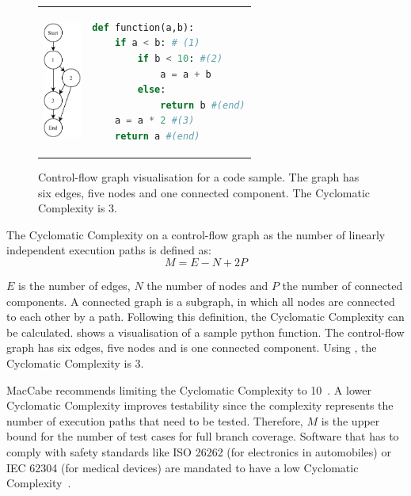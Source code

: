 \begin{figure}
\begin{tabular}{p{}p{}}
    \begin{minipage}{0.45\textwidth}
        \centering
    \includegraphics[height=1.5in]{img/Background/control-flow-graph.pdf}
    \label{fig:background_control_flow_graph_image}
    \end{minipage}
&
\begin{minipage}[c]{0.45\textwidth}
\centering
\begin{lstlisting}[language=Python, label=lst:background_control_flow_graph_listing]
def function(a,b):
    if a < b: # (1)
        if b < 10: #(2)
            a = a + b
        else:
            return b #(end)
    a = a * 2 #(3)
    return a #(end)
\end{lstlisting}
\end{minipage}
\end{tabular}
\caption{Control-flow graph visualisation for a code sample. The graph has six edges, five nodes and one connected component. The Cyclomatic Complexity is 3.}
\label{fig:background_control_flow_graph}
\end{figure}

The Cyclomatic Complexity on a control-flow graph as the number of linearly independent execution paths is defined as:
\begin{equation}\label{eq:cyclomatic_complexity}
M = E - N + 2P
\end{equation}

$E$ is the number of edges, $N$ the number of nodes and $P$ the number of connected components.  A connected graph is a subgraph, in which all nodes are connected to each other by a path. Following this definition, the Cyclomatic Complexity can be calculated.  shows a visualisation of a sample python function. The control-flow graph has six edges, five nodes and is one connected component. Using , the Cyclomatic Complexity is 3.

MacCabe recommends limiting the Cyclomatic Complexity to 10~\cite{mccabe_complexity_1976}. A lower Cyclomatic Complexity improves testability since the complexity represents the number of execution paths that need to be tested. Therefore, $M$ is the upper bound for the number of test cases for full branch coverage. 
Software that has to comply with safety standards like ISO 26262 (for electronics in automobiles) or IEC 62304 (for medical devices) are mandated to have a low Cyclomatic Complexity~\cite{isotc_22sc_32_iso_2018, isotc_210_iec_2006}.

